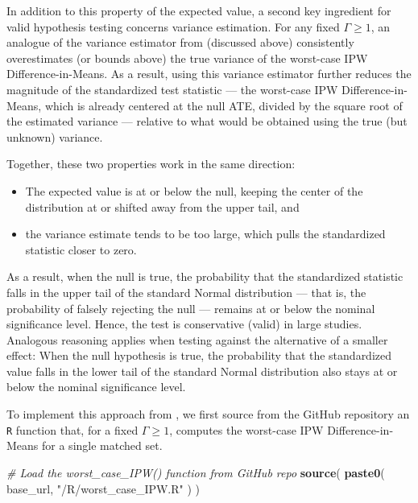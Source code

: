 \documentclass[
  12pt,
  leqno]{article}
\newenvironment{Shaded}{\begin{snugshade}}{\end{snugshade}}
\newcommand{\CommentTok}[1]{\textcolor[rgb]{0.56,0.35,0.01}{\textit{#1}}}
\newcommand{\FunctionTok}[1]{\textcolor[rgb]{0.13,0.29,0.53}{\textbf{#1}}}
\newcommand{\NormalTok}[1]{#1}
\newcommand{\StringTok}[1]{\textcolor[rgb]{0.31,0.60,0.02}{#1}}
\providecommand{\tightlist}{%
  \setlength{\itemsep}{0pt}\setlength{\parskip}{0pt}}
\def\tightlist{}
\begin{document}
In addition to this property of the expected value, a second key
ingredient for valid hypothesis testing concerns variance estimation.
For any fixed \(\Gamma \geq 1\), an analogue of the variance estimator
from \citet{fogarty2018} (discussed above) consistently overestimates
(or bounds above) the true variance of the worst-case IPW
Difference-in-Means. As a result, using this variance estimator further
reduces the magnitude of the standardized test statistic --- the
worst-case IPW Difference-in-Means, which is already centered at the
null ATE, divided by the square root of the estimated variance ---
relative to what would be obtained using the true (but unknown)
variance.

Together, these two properties work in the same direction:

\begin{itemize}
\tightlist
\item
  The expected value is at or below the null, keeping the center of the
  distribution at or shifted away from the upper tail, and
\item
  the variance estimate tends to be too large, which pulls the
  standardized statistic closer to zero.
\end{itemize}

As a result, when the null is true, the probability that the
standardized statistic falls in the upper tail of the standard Normal
distribution --- that is, the probability of falsely rejecting the null
--- remains at or below the nominal significance level. Hence, the test
is conservative (valid) in large studies. Analogous reasoning applies
when testing against the alternative of a smaller effect: When the null
hypothesis is true, the probability that the standardized value falls in
the lower tail of the standard Normal distribution also stays at or
below the nominal significance level.

To implement this approach from \citet{fogarty2023}, we first source
from the GitHub repository an \texttt{R} function that, for a fixed
\(\Gamma \geq 1\), computes the worst-case IPW Difference-in-Means for a
single matched set.

\singlespacing

\begin{Shaded}
\begin{Highlighting}[]
\CommentTok{\# Load the worst\_case\_IPW() function from GitHub repo}
\FunctionTok{source}\NormalTok{(}
  \FunctionTok{paste0}\NormalTok{(}
\NormalTok{    base\_url, }\StringTok{"/R/worst\_case\_IPW.R"}
\NormalTok{  )}
\NormalTok{)}
\end{Highlighting}
\end{Shaded}
\end{document}
